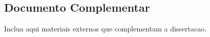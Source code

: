 \begin{anexosenv}
\partanexos

\chapter{Documento Complementar}

Inclua aqui materiais externos que complementam a dissertacao.

\end{anexosenv}

